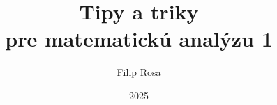 \documentclass[12pt, a4paper]{article}
\title {\Huge \textbf {Tipy a triky \\ pre matematickú analýzu 1}}
\author{Filip Rosa}
\date{2025}
\begin{document}
\maketitle

\cleardoublepage

\renewcommand{\contentsname}{Obsah}

\tableofcontents

\newpage



\newpage


\end{document}

